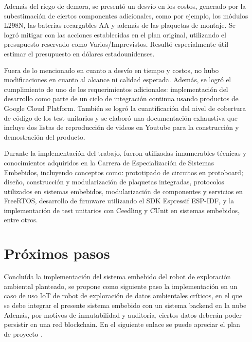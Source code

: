 Además del riego de demora, se presentó un desvío en los costos, generado por la subestimación de ciertos componentes adicionales, como por ejemplo, los módulos L298N, las baterías recargables AA y además de las plaquetas de montaje. Se logró mitigar con las acciones establecidas en el plan original, utilizando el presupuesto reservado como Varios/Imprevistos. Resultó especialmente útil estimar el presupuesto en dólares estadounidenses.


Fuera de lo mencionado en cuanto a desvío en tiempo y costos, no hubo modificaciones en cuanto al alcance ni calidad esperada. Además, se logró el cumplimiento de uno de los requerimientos adicionales: implementación del desarrollo como parte de un ciclo de integración continua usando productos de Google Cloud Platform. También se logró la cuantificación del nivel de cobertura de código de los test unitarios y se elaboró una documentación exhaustiva que incluye dos listas de reproducción de videos en Youtube para la construcción y demostración del producto.


Durante la implementación del trabajo, fueron utilizadas innumerables técnicas y conocimientos adquiridos en la Carrera de Especialización de Sistemas Embebidos, incluyendo conceptos como: prototipado de circuitos en protoboard; diseño, construcción y modularización de plaquetas integradas, protocolos utilizados en sistemas embebidos, modularización de componentes y servicios en FreeRTOS, desarrollo de firmware utilizando el SDK Espressif ESP-IDF, y la implementación de test unitarios con Ceedling y CUnit en sistemas embebidos, entre otros.





\section{Próximos pasos}

Concluída la implementación del sistema embebido del robot de exploración ambiental planteado, se propone como siguiente paso la implementación en un caso de uso IoT de robot de exploración de datos ambientales críticos, en el que se debe integrar el presente sistema embebido con un sistema backend en la nube Además, por motivos de inmutabilidad y auditoria, ciertos datos deberán poder persistir en una red blockchain. En el siguiente enlace se puede apreciar el plan de proyecto \cite{Robot_CEIOT_Planificacion_doc}.